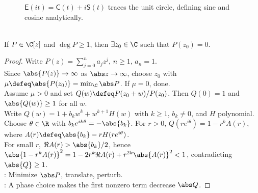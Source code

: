 \begin{figure}[H]
  \centering
  
  \caption{$\mathsf{E}(it)=\mathsf{C}(t)+i\mathsf{S}(t)$ traces the unit circle, defining sine and cosine analytically.}
  \label{fig:exponential-unit-circle}
\end{figure}

\begin{theorem} \label{thm:fundamental-theorem-algebra-exponential-proof} \\
If $P\in\C[z]$ and $\deg P\geq1$, then $\exists z_0\in\C$ such that $P(z_0)=0$.
\begin{proof} Write $P(z)=\sum_{j=0}^{n}a_jz^j$, $n\geq1$, $a_n=1$.\\
Since $\abs{P(z)}\to\infty$ as $\abs z\to\infty$, choose $z_0$ with $\mu\defeq\abs{P(z_0)}=\min_{\C}\abs P$. If $\mu=0$, done.\\
Assume $\mu>0$ and set $Q(w)\defeq P(z_0+w)/P(z_0)$. Then $Q(0)=1$ and $\abs{Q(w)}\geq1$ for all $w$.\\
Write $Q(w)=1+b_kw^k+w^{k+1}H(w)$ with $k\geq1$, $b_k\neq0$, and $H$ polynomial.\\
Choose $\theta\in\R$ with $b_ke^{ik\theta}=-\abs{b_k}$. For $r>0$, $Q(re^{i\theta})=1-r^kA(r)$, where $A(r)\defeq\abs{b_k}-rH(re^{i\theta})$.\\
For small $r$, $\Re A(r)>\abs{b_k}/2$, hence $\abs{1-r^kA(r)}^2=1-2r^k\Re A(r)+r^{2k}\abs{A(r)}^2<1$, contradicting $\abs{Q}\geq1$.\\
: Minimize $\abs P$, translate, perturb.\\
: A phase choice makes the first nonzero term decrease $\abs Q$.
\end{proof}
\end{theorem}

